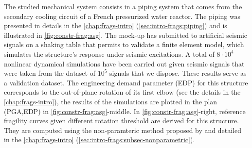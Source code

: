 The studied mechanical system consists in a piping system that comes from the secondary cooling circuit of a French pressurized water reactor.
The piping was presented in details in the \cref{chap:frags-intro} (\cref{sec:intro-frags:piping}) and is illustrated in \cref{fig:constr-frag:asg}.
The mock-up has submitted to artificial seismic signals on a shaking table that permits to validate a finite element model, which simulates the structure's response under seismic excitations.
A total of $8\cdot 10^4$ nonlinear dynamical simulations have been carried out given seismic signals that were taken from the dataset of $10^5$ signals that we dispose. These results serve as a validation dataset. 
The engineering demand parameter (EDP) for this structure corresponds to the out-of-plane rotation of its first elbow (see the details in the \cref{chap:frags-intro}), the results of the simulations are plotted in the plan (PGA,EDP) in \cref{fig:constr-frag:asg}-middle.
In \cref{fig:constr-frag:asg}-right, reference fragility curves given different rotation threshold are derived for this structure. They are computed using the non-paramteric method proposed by \citet{trevlopoulos_parametric_2019} and detailed in the \cref{chap:frags-intro} (\cref{sec:intro-frags:subsec-nonparametric}).






